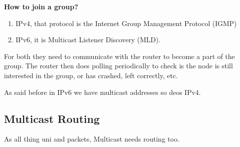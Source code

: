\documentclass[11pt, a4paper]{article}
\begin{document}
\textbf{How to join a group?}
\begin{enumerate}
    \item IPv4, that protocol is the Internet Group Management Protocol (IGMP)
    \item IPv6, it is Multicast Listener Discovery (MLD).
\end{enumerate}
For both they need to communicate with the router to become a part of the group. The router then does polling periodically to check is the node is still interested in the group, or has crashed, left correctly, etc.

As said before in IPv6 we have multicast addresses so deos IPv4.

\subsection{Multicast Routing}
As all thing uni and packets, Multicast needs routing too.
\end{document}
